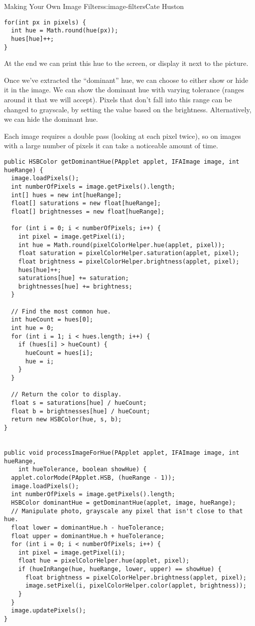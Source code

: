 \begin{aosachapter}{Making Your Own Image Filters}{s:image-filters}{Cate Huston}
\begin{verbatim}
for(int px in pixels) {
  int hue = Math.round(hue(px));
  hues[hue]++;
}
\end{verbatim}

At the end we can print this hue to the screen, or display it next to
the picture.

Once we've extracted the ``dominant'' hue, we can choose to either show
or hide it in the image. We can show the dominant hue with varying
tolerance (ranges around it that we will accept). Pixels that don't fall
into this range can be changed to grayscale, by setting the value based
on the brightness. Alternatively, we can hide the dominant hue.

Each image requires a double pass (looking at each pixel twice), so on
images with a large number of pixels it can take a noticeable amount of
time.

\begin{verbatim}
public HSBColor getDominantHue(PApplet applet, IFAImage image, int hueRange) {
  image.loadPixels();
  int numberOfPixels = image.getPixels().length;
  int[] hues = new int[hueRange];
  float[] saturations = new float[hueRange];
  float[] brightnesses = new float[hueRange];

  for (int i = 0; i < numberOfPixels; i++) {
    int pixel = image.getPixel(i);
    int hue = Math.round(pixelColorHelper.hue(applet, pixel));
    float saturation = pixelColorHelper.saturation(applet, pixel);
    float brightness = pixelColorHelper.brightness(applet, pixel);
    hues[hue]++;
    saturations[hue] += saturation;
    brightnesses[hue] += brightness;
  }

  // Find the most common hue.
  int hueCount = hues[0];
  int hue = 0;
  for (int i = 1; i < hues.length; i++) {
    if (hues[i] > hueCount) {
      hueCount = hues[i];
      hue = i;
    }
  }

  // Return the color to display.
  float s = saturations[hue] / hueCount;
  float b = brightnesses[hue] / hueCount;
  return new HSBColor(hue, s, b);
}


public void processImageForHue(PApplet applet, IFAImage image, int hueRange,
    int hueTolerance, boolean showHue) {
  applet.colorMode(PApplet.HSB, (hueRange - 1));
  image.loadPixels();
  int numberOfPixels = image.getPixels().length;
  HSBColor dominantHue = getDominantHue(applet, image, hueRange);
  // Manipulate photo, grayscale any pixel that isn't close to that hue.
  float lower = dominantHue.h - hueTolerance;
  float upper = dominantHue.h + hueTolerance;
  for (int i = 0; i < numberOfPixels; i++) {
    int pixel = image.getPixel(i);
    float hue = pixelColorHelper.hue(applet, pixel);
    if (hueInRange(hue, hueRange, lower, upper) == showHue) {
      float brightness = pixelColorHelper.brightness(applet, pixel);
      image.setPixel(i, pixelColorHelper.color(applet, brightness));
    }
  }
  image.updatePixels();
}
\end{verbatim}


\end{aosachapter}

